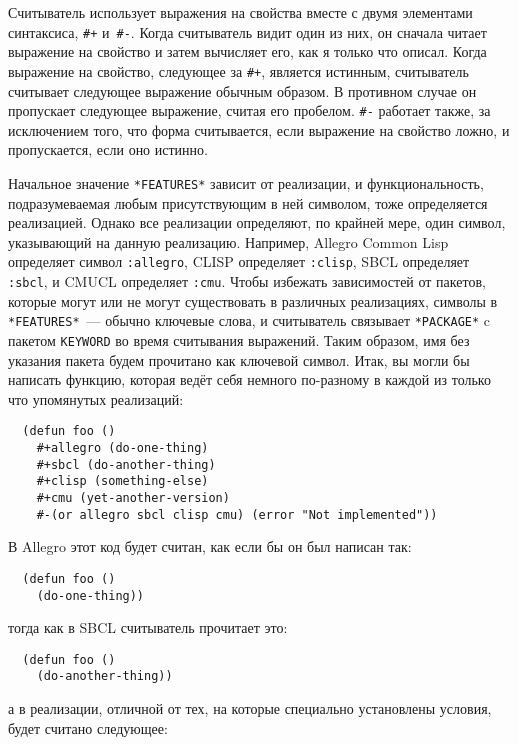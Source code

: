 Считыватель использует выражения на свойства вместе с двумя элементами синтаксиса,
\lstinline!#+! и~\lstinline!#-!. Когда считыватель видит один из них, он сначала читает
выражение на свойство и затем вычисляет его, как я только что описал. Когда выражение на
свойство, следующее за \lstinline!#+!, является истинным, считыватель считывает следующее
выражение обычным образом. В противном случае он пропускает следующее выражение, считая
его пробелом. \lstinline!#-! работает также, за исключением того, что форма считывается,
если выражение на свойство ложно, и пропускается, если оно истинно.

Начальное значение \lstinline{*FEATURES*} зависит от реализации, и функциональность,
подразумеваемая любым присутствующим в ней символом, тоже определяется реализацией. Однако
все реализации определяют, по крайней мере, один символ, указывающий на данную реализацию.
Например, Allegro Common Lisp определяет символ \lstinline{:allegro}, CLISP определяет
\lstinline{:clisp}, SBCL определяет \lstinline{:sbcl}, и CMUCL определяет
\lstinline{:cmu}.  Чтобы избежать зависимостей от пакетов, которые могут или не могут
существовать в различных реализациях, символы в \lstinline{*FEATURES*}~--- обычно ключевые
слова, и считыватель связывает \lstinline{*PACKAGE*} c пакетом \lstinline{KEYWORD} во
время считывания выражений. Таким образом, имя без указания пакета будем прочитано как
ключевой символ. Итак, вы могли бы написать функцию, которая ведёт себя немного по-разному
в каждой из только что упомянутых реализаций:

\begin{lstlisting}
  (defun foo ()
    #+allegro (do-one-thing)
    #+sbcl (do-another-thing)
    #+clisp (something-else)
    #+cmu (yet-another-version)
    #-(or allegro sbcl clisp cmu) (error "Not implemented"))
\end{lstlisting}

\noindent{}В Allegro этот код будет считан, как если бы он был написан так:

\begin{lstlisting}
  (defun foo ()
    (do-one-thing))
\end{lstlisting}

\noindent{}тогда как в SBCL считыватель прочитает это:

\begin{lstlisting}
  (defun foo ()
    (do-another-thing))
\end{lstlisting}

\noindent{}а в реализации, отличной от тех, на которые специально установлены условия, будет считано
следующее:

